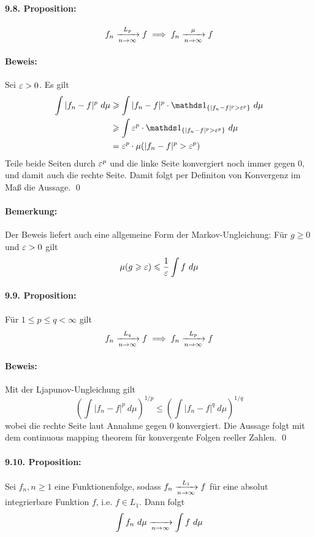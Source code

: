 \documentclass[11pt]{report}
\begin{document}
\paragraph{9.8. Proposition:}
$$f_n\nto{L_p}{n\to\infty}f\implies f_n\nto{\mu}{n\to\infty}f$$

\paragraph{Beweis:}Sei $\varepsilon>0$. Es gilt
\begin{align*}
    \int|f_n-f|^p\ d\mu&\geq \int|f_n-f|^p\cdot\ind{\{|f_n-f|^p>\eps^p\}}\ d\mu\\
    &\geq \int \eps^p\cdot\ind{\{|f_n-f|^p>\eps^p\}}\ d\mu \\
    &=\eps^p\cdot\mu(|f_n-f|^p>\eps^p)
\end{align*}
Teile beide Seiten durch $\varepsilon^p$ und die linke Seite konvergiert noch immer gegen $0$, und damit auch die rechte Seite. Damit folgt per Definiton von Konvergenz im Ma\ss{} die Aussage. \qed

\paragraph{Bemerkung:} Der Beweis liefert auch eine allgemeine Form der Markov-Ungleichung: F\"ur $g\geq0$ und $\varepsilon>0$ gilt
$$\mu(g\geq\eps)\leq\dfrac{1}{\eps}\int f\ d\mu$$

\paragraph{9.9. Proposition:} F\"ur $1\leq p\leq q<\infty$ gilt 
$$f_n\nto{L_q}{n\to\infty}f\implies f_n\nto{L_p}{n\to\infty}f$$
\paragraph{Beweis:}Mit der Ljapunov-Ungleichung gilt
$$\left(\int|f_n-f|^p\ d\mu\right)^{1/p}\leq\left(\int|f_n-f|^q\ d\mu \right)^{1/q}$$
wobei die rechte Seite laut Annahme gegen $0$ konvergiert. Die Aussage folgt mit dem continuous mapping theorem f\"ur konvergente Folgen reeller Zahlen. \qed

\paragraph{9.10. Proposition:}Sei $f_n,n\geq1$ eine Funktionenfolge, sodass $f_n\nto{L_1}{n\to\infty}f$ f\"ur eine absolut integrierbare Funktion $f$, i.e. $f\in L_1$. Dann folgt
$$\int f_n\ d\mu\nto{}{n\to\infty}\int f\ d\mu$$
\end{document}
